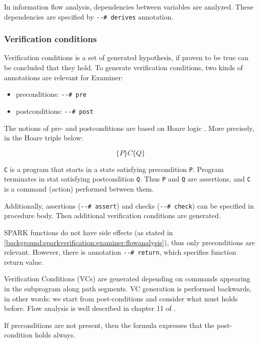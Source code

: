 In information flow analysis, dependencies between variables are analyzed. These dependencies are specified by \lstinline{--# derives} annotation.


\subsubsection{Verification conditions}
\label{background:sparkverification:examiner:vc}

Verification conditions is a set of generated hypothesis, if proven to be true can be concluded that they hold. To generate verification conditions, two kinds of annotations are relevant for Examiner:
\begin{itemize}
	\item preconditions: \lstinline{--# pre}
	\item postconditions: \lstinline{--# post}
\end{itemize}

The notions of pre- and postconditions are based on Hoare logic \cite{HoareLogic:Paper}. More precisely, in the Hoare triple below: 

\begin{equation} \label{eq:hoare_triple}
	\{P\} C \{Q\}
\end{equation}

\lstinline{C} is a program that starts in a state satisfying precondition \lstinline{P}. Program terminates in stat satisfying postcondition \lstinline{Q}. Thus \lstinline{P} and \lstinline{Q} are assertions, and \lstinline{C} is a command (action) performed between them.

Additionally, assertions (\lstinline{--# assert}) and checks (\lstinline{--# check}) can be specified in procedure body. Then additional verification conditions are generated.

SPARK functions do not have side effects (as stated in \ref{background:sparkverification:examiner:flowanalysis}), thus only preconditions are relevant. However, there is annotation \lstinline{--# return}, which specifies function return value.

Verification Conditions (VCs) are generated depending on commands appearing in the subprogram along path segments. VC generation is performed backwards, in other words: we start from post-conditions and consider what must holds before. Flow analysis is well described in chapter 11 of \cite{Barnes:Book}.

If preconditions are not present, then the formula expresses that the post-condition holds always.




